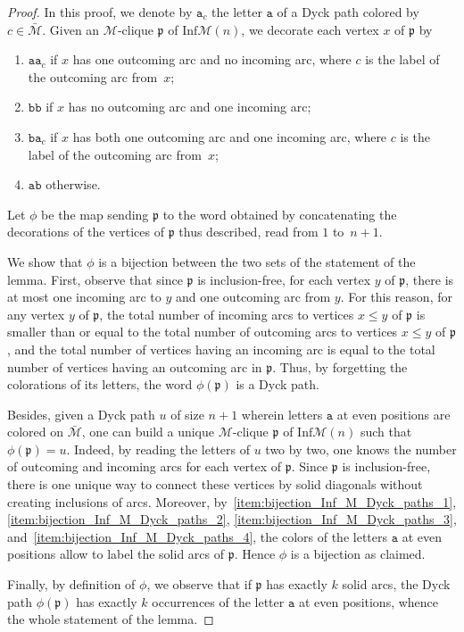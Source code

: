 \documentclass[10pt,reqno]{amsart}
\numberwithin{equation}{subsection}
\renewcommand{\leq}{\leqslant}
\newcommand{\Mca}{\mathcal{M}}
\newcommand{\Pfr}{\mathfrak{p}}
\newcommand{\Att}{\mathtt{a}}
\newcommand{\Btt}{\mathtt{b}}
\newcommand{\Inf}{\mathrm{Inf}}
\begin{document}
\begin{proof}
    In this proof, we denote by $\Att_c$ the letter $\Att$ of a Dyck
    path colored by $c \in \bar{\Mca}$. Given an $\Mca$-clique $\Pfr$ of
    $\Inf\Mca(n)$, we decorate each vertex $x$ of $\Pfr$ by
    \begin{enumerate}[fullwidth,label={(\it\arabic*)}]
        \item \label{item:bijection_Inf_M_Dyck_paths_1}
        $\Att\Att_c$ if $x$ has one outcoming arc and no incoming arc,
        where $c$ is the label of the outcoming arc from~$x$;
        \item \label{item:bijection_Inf_M_Dyck_paths_2}
        $\Btt\Btt$ if $x$ has no outcoming arc and one incoming arc;
        \item \label{item:bijection_Inf_M_Dyck_paths_3}
        $\Btt\Att_c$ if $x$ has both one outcoming arc and one incoming
        arc, where $c$ is the label of the outcoming arc from~$x$;
        \item \label{item:bijection_Inf_M_Dyck_paths_4}
        $\Att\Btt$ otherwise.
    \end{enumerate}
    Let $\phi$ be the map sending $\Pfr$ to the word obtained by
    concatenating the decorations of the vertices of $\Pfr$ thus
    described, read from $1$ to~$n + 1$.
    \smallskip

    We show that $\phi$ is a bijection between the two sets of the
    statement of the lemma. First, observe that since $\Pfr$ is
    inclusion-free, for each vertex $y$ of $\Pfr$, there is at most one
    incoming arc to $y$ and one outcoming arc from $y$. For this reason,
    for any vertex $y$ of $\Pfr$, the total number of incoming arcs to
    vertices $x \leq y$ of $\Pfr$ is smaller than or equal to the total
    number of outcoming arcs to vertices $x \leq y$ of $\Pfr$, and the
    total number of vertices having an incoming arc is equal to the
    total number of vertices having an outcoming arc in $\Pfr$. Thus, by
    forgetting the colorations of its letters, the word $\phi(\Pfr)$ is
    a Dyck path.
    \smallskip

    Besides, given a Dyck path $u$ of size $n + 1$ wherein letters
    $\Att$ at even positions are colored on $\bar{\Mca}$, one can build
    a unique $\Mca$-clique $\Pfr$ of $\Inf\Mca(n)$ such that
    $\phi(\Pfr) = u$. Indeed, by reading the letters of $u$ two by two,
    one knows the number of outcoming and incoming arcs for each vertex
    of $\Pfr$. Since $\Pfr$ is inclusion-free, there is one unique way
    to connect these vertices by solid diagonals without creating
    inclusions of arcs. Moreover,
    by~\ref{item:bijection_Inf_M_Dyck_paths_1},
    \ref{item:bijection_Inf_M_Dyck_paths_2},
    \ref{item:bijection_Inf_M_Dyck_paths_3},
    and~\ref{item:bijection_Inf_M_Dyck_paths_4}, the colors of the
    letters $\Att$ at even positions allow to label the solid arcs of
    $\Pfr$. Hence $\phi$ is a bijection as claimed.
    \smallskip

    Finally, by definition of $\phi$, we observe that if $\Pfr$ has
    exactly $k$ solid arcs, the Dyck path $\phi(\Pfr)$ has exactly $k$
    occurrences of the letter $\Att$ at even positions, whence the whole
    statement of the lemma.
\end{proof}
\end{document}
